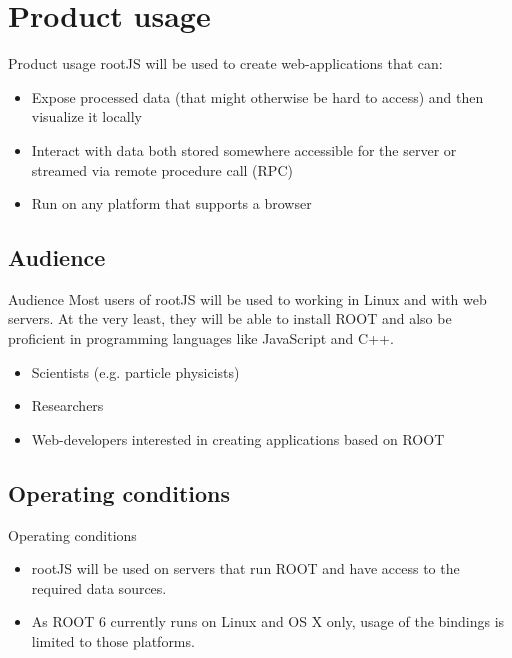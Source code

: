 \section{Product usage}
\begin{frame}{Product usage}
        rootJS will be used to create web-applications that can:
        \begin{itemize}
        	\item Expose processed data (that might otherwise be hard to access) and then visualize it locally
        	\item Interact with data both stored somewhere accessible for the server or streamed via remote procedure call (RPC)
        	\item Run on any platform that supports a browser
        \end{itemize}
\end{frame}


\subsection{Audience}
\begin{frame}{Audience}
        Most users of rootJS will be used to working in Linux and with web servers. At the very least, they will be able to install ROOT
        and also be proficient in programming languages like JavaScript and C++.
        \begin{itemize}
        	\item Scientists (e.g. particle physicists)
        	\item Researchers
        	\item Web-developers interested in creating applications based on ROOT
        \end{itemize}
\end{frame}

\subsection{Operating conditions}
\begin{frame}{Operating conditions}
        \begin{itemize}
                \item rootJS will be used on servers that run ROOT and have access to the required data sources.
                \item As ROOT 6 currently runs on Linux and OS X only, usage of the bindings is limited to those platforms.
        \end{itemize}
\end{frame}
